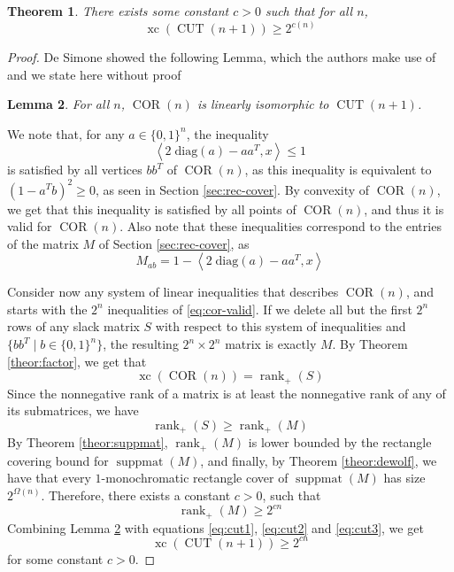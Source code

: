 \documentclass{article}
\newtheorem{theorem}{\sc Theorem}
\newtheorem{lemma}[theorem]{\sc Lemma}
\theoremstyle{definition}
\theoremstyle{remark}
\newcommand{\nrank}{\operatorname{rank}_+}
\newcommand{\suppmat}{\operatorname{suppmat}}
\newcommand{\xc}{\operatorname{xc}}
\newcommand{\CUT}{\operatorname{CUT}}
\newcommand{\COR}{\operatorname{COR}}
\begin{document}
\begin{theorem}\label{theor:cut}
There exists some constant $c > 0$ such that for all $n$,
\[
\xc(\CUT(n+1)) \geq 2^{c(n)}
\]
\end{theorem}
\begin{proof}
De Simone \cite{de-simone} showed the following Lemma, which the authors make use of and we state here without proof

\begin{lemma}\label{lem:cut-cor}
For all $n$, $\COR(n)$ is linearly isomorphic to $\CUT(n+1)$.
\end{lemma}

We note that, for any $a \in {\{0, 1\}}^n$, the inequality
\begin{equation}\label{eq:cor-valid}
\left\langle 2 \; \text{diag}(a) - aa^T, x \right\rangle \leq 1
\end{equation}
is satisfied by all vertices $bb^T$ of $\COR(n)$, as this inequality is equivalent to ${(1 - a^Tb)}^2 \geq 0$, as seen in Section \ref{sec:rec-cover}. By convexity of $\COR(n)$, we get that this inequality is satisfied by all points of $\COR(n)$, and thus it is valid for $\COR(n)$. Also note that these inequalities correspond to the entries of the matrix $M$ of Section \ref{sec:rec-cover}, as
\[
M_{ab} = 1 - \left\langle 2 \; \text{diag}(a) - aa^T, x \right\rangle
\]

Consider now any system of linear inequalities that describes $\COR(n)$, and starts with the $2^n$ inequalities of \eqref{eq:cor-valid}. If we delete all but the first $2^n$ rows of any slack matrix $S$ with respect to this system of inequalities and $\{bb^T \mid b \in {\{0, 1\}}^n \}$, the resulting $2^n \times 2^n$ matrix is exactly $M$. By Theorem \ref{theor:factor}, we get that
\begin{equation}\label{eq:cut1}
\xc(\COR(n)) = \nrank(S)
\end{equation}
Since the nonnegative rank of a matrix is at least the nonnegative rank of any of its submatrices, we have
\begin{equation}\label{eq:cut2}
\nrank(S) \geq \nrank(M)
\end{equation}
By Theorem \ref{theor:suppmat}, $\nrank(M)$ is lower bounded by the rectangle covering bound for $\suppmat(M)$, and finally, by Theorem \ref{theor:dewolf}, we have that every $1$-monochromatic rectangle cover of $\suppmat(M)$ has size $2^{\Omega(n)}$. Therefore, there exists a constant $c > 0$, such that
\begin{equation}\label{eq:cut3}
\nrank(M) \geq 2^{cn}
\end{equation}
Combining Lemma \ref{lem:cut-cor} with equations \eqref{eq:cut1}, \eqref{eq:cut2} and \eqref{eq:cut3}, we get
\[
\xc(\CUT(n+1)) \geq 2^{cn}
\]
for some constant $c > 0$.
\end{proof}
\end{document}
